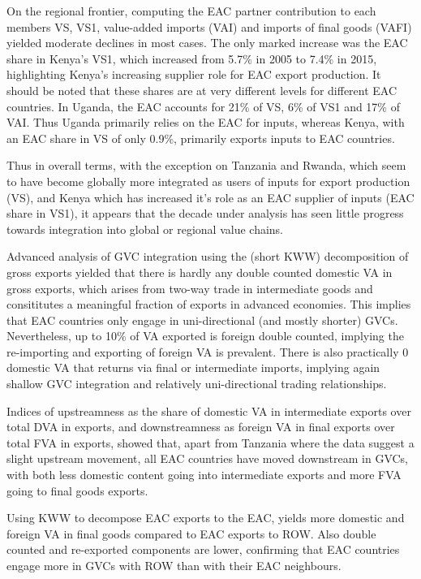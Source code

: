 \documentclass[a4paper]{article}
\begin{document}
On the regional frontier, computing the EAC partner contribution to each members VS, VS1, value-added imports (VAI) and imports of final goods (VAFI) yielded moderate declines in most cases. The only marked increase was the EAC share in Kenya's VS1, which increased from 5.7\% in 2005 to 7.4\% in 2015, highlighting Kenya's increasing supplier role for EAC export production. It should be noted that these shares are at very different levels for different EAC countries. In Uganda, the EAC accounts for 21\% of VS, 6\% of VS1 and 17\% of VAI. Thus Uganda primarily relies on the EAC for inputs, whereas Kenya, with an EAC share in VS of only 0.9\%, primarily exports inputs to EAC countries. \newline

Thus in overall terms, with the exception on Tanzania and Rwanda, which seem to have become globally more integrated as users of inputs for export production (VS), and Kenya which has increased it's role as an EAC supplier of inputs (EAC share in VS1), it appears that the decade under analysis has seen little progress towards integration into global or regional value chains.  \newline

Advanced analysis of GVC integration using the \citet{koopman2014tracing} (short KWW) decomposition of gross exports yielded that there is hardly any double counted domestic VA in gross exports, which arises from two-way trade in intermediate goods and consititutes a meaningful fraction of exports in advanced economies. This implies that EAC countries only engage in uni-directional (and mostly shorter) GVCs. Nevertheless, up to 10\% of VA exported is foreign double counted, implying the re-importing and exporting of foreign VA is prevalent. There is also practically 0 domestic VA that returns via final or intermediate imports, implying again shallow GVC integration and relatively uni-directional trading relationships. \newline
 
 Indices of upstreamness as the share of domestic VA in intermediate exports over total DVA in exports, and downstreamness as foreign VA in final exports over total FVA in exports, showed that, apart from Tanzania where the data suggest a slight upstream movement, all EAC countries have moved downstream in GVCs, with both less domestic content going into intermediate exports and more FVA going to final goods exports. \newline
 
 Using KWW to decompose EAC exports to the EAC, yields more domestic and foreign VA in final goods compared to EAC exports to ROW. Also double counted and re-exported components are lower, confirming that EAC countries engage more in GVCs with ROW than with their EAC neighbours. \newline
 
\end{document}
